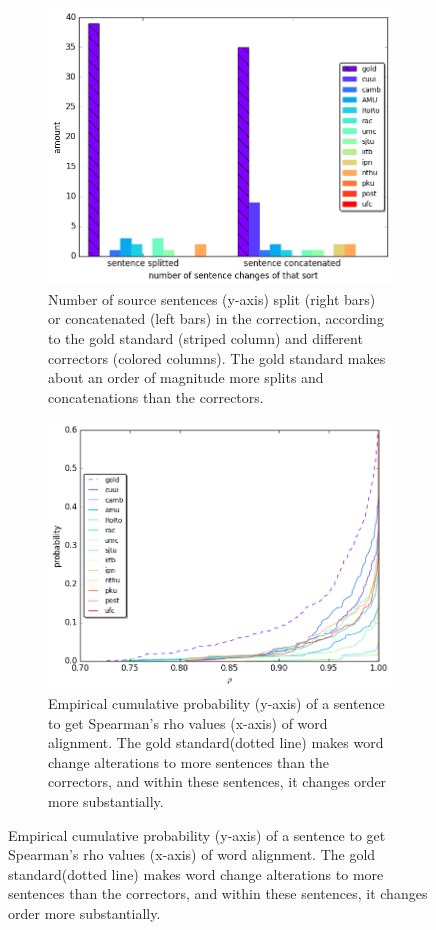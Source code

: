 \documentclass[letter,11pt]{article}
\newcommand{\com}[1]{}
\begin{document}
\begin{figure}[tbp]
  \centering
  \begin{subfigure}[]{0.4\textwidth}
  	\includegraphics[width = \textwidth]{aligned}
  	\caption{Number of source sentences (y-axis) split 
  		(right bars) or concatenated (left bars) in the correction, according to the gold standard (striped column) and different correctors (colored columns). The gold standard makes about an order of magnitude more splits and concatenations than the correctors.\label{fig:split}}
  \end{subfigure}

  \begin{subfigure}[]{0.4\textwidth}
  	\com{\caption{\label{fig:rho}}}
    \includegraphics[width = \textwidth]{spearman_ecdf}
    \caption{Empirical cumulative probability (y-axis) of a sentence to get Spearman's rho values (x-axis) of word alignment. The gold standard(dotted line) makes word change alterations to more sentences than the correctors, and within these sentences, it changes order more substantially.\label{fig:rho}}
  \end{subfigure}


\end{figure}
\end{document}
